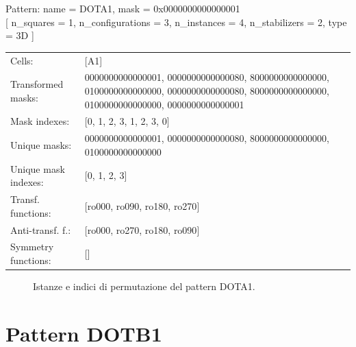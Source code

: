 \begin{tcolorbox}[sharp corners, fontupper=\ttfamily\small, colback=white]
  \noindent Pattern: name = DOTA1, mask = 0x0000000000000001\\
  {[} n\_squares = 1, n\_configurations = 3,
  n\_instances = 4, n\_stabilizers = 2, type = 3D { ]}\\[1.0ex]
  \begin{tabularx}{\textwidth}{@{} p{3.5cm} X @{}}
    Cells:               & {[}A1{]}\\[0.5ex]
    Transformed masks:   & 0000000000000001, 0000000000000080, 8000000000000000, 0100000000000000, 0000000000000080, 8000000000000000, 0100000000000000, 0000000000000001\\[0.5ex]
    Mask indexes:        & {[}0, 1, 2, 3, 1, 2, 3, 0{]}\\[0.5ex]
    Unique masks:        & 0000000000000001, 0000000000000080, 8000000000000000, 0100000000000000\\[0.5ex]
    Unique mask indexes: & {[}0, 1, 2, 3{]}\\[0.5ex]
    Transf. functions:   & {[}ro000, ro090, ro180, ro270{]}\\[0.5ex]
    Anti-transf. f.:     & {[}ro000, ro270, ro180, ro090{]}\\[0.5ex]
    Symmetry functions:  & {[}{]}\\[0.5ex]
  \end{tabularx}
\end{tcolorbox}

\begin{figure}[htbp]
  \centering
   \hfill
   \hfill
   \hfill
  \vspace{0.3cm}
   \hfill
   \hfill
   \hfill
  \caption{Istanze e indici di permutazione del pattern DOTA1.}
\end{figure}

\newpage

\section{Pattern DOTB1}

